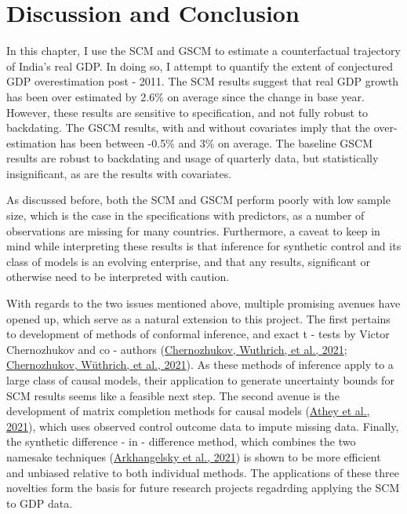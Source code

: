 \documentclass[12pt,nobind, a4paper]{reedthesis}
\begin{document}
 \hypertarget{discussion-and-conclusion}{%
 \section{Discussion and Conclusion}\label{discussion-and-conclusion}}

 In this chapter, I use the SCM and GSCM to estimate a counterfactual trajectory of India's real GDP. In doing so, I attempt to quantify the extent of conjectured GDP overestimation post - 2011. The SCM results suggest that real GDP growth has been over estimated by 2.6\% on average since the change in base year. However, these results are sensitive to specification, and not fully robust to backdating. The GSCM results, with and without covariates imply that the over-estimation has been between -0.5\% and 3\% on average. The baseline GSCM results are robust to backdating and usage of quarterly data, but statistically insignificant, as are the results with covariates.
 \linebreak

 As discussed before, both the SCM and GSCM perform poorly with low sample size, which is the case in the specifications with predictors, as a number of observations are missing for many countries. Furthermore, a caveat to keep in mind while interpreting these results is that inference for synthetic control and its class of models is an evolving enterprise, and that any results, significant or otherwise need to be interpreted with caution.
 \linebreak

 With regards to the two issues mentioned above, multiple promising avenues have opened up, which serve as a natural extension to this project. The first pertains to development of methods of conformal inference, and exact t - tests by Victor Chernozhukov and co - authors (\protect\hyperlink{ref-chernozhukov_t-test_2021}{Chernozhukov, Wuthrich, et al., 2021}; \protect\hyperlink{ref-chernozhukov_exact_2021}{Chernozhukov, Wüthrich, et al., 2021}). As these methods of inference apply to a large class of causal models, their application to generate uncertainty bounds for SCM results seems like a feasible next step. The second avenue is the development of matrix completion methods for causal models (\protect\hyperlink{ref-athey_matrix_2021}{Athey et al., 2021}), which uses observed control outcome data to impute missing data. Finally, the synthetic difference - in - difference method, which combines the two namesake techniques (\protect\hyperlink{ref-arkhangelsky_synthetic_2021}{Arkhangelsky et al., 2021}) is shown to be more efficient and unbiased relative to both individual methods. The applications of these three novelties form the basis for future research projects regadrding applying the SCM to GDP data.
\end{document}
